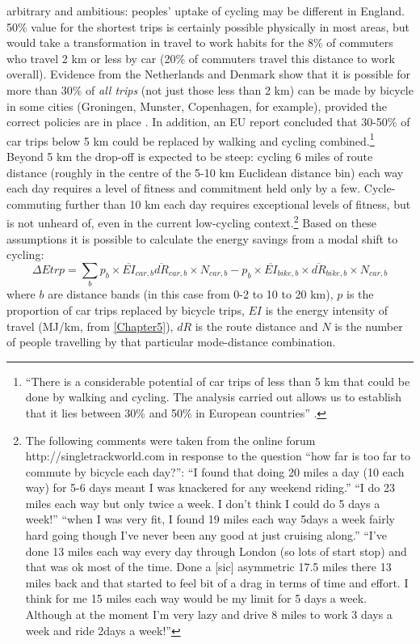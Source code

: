 \documentclass[a4paper, 11pt, twoside]{Thesis}
\begin{document}
arbitrary and ambitious: peoples' uptake of cycling may be different in England.
50\% value for the shortest trips is certainly possible physically in most
areas, but would
take a transformation in travel to work habits for the 8\% of commuters who
travel 2 km or less by car (20\% of commuters travel this distance to work
overall). Evidence from the Netherlands and Denmark show that it
is possible for more than 30\% of \emph{all trips} (not just those less than 2
km) can be made by bicycle in some cities (Groningen, Munster, Copenhagen,
for example), provided the correct policies are in place \citep{Rietveld2004,
Pucher2010}.
In addition, an EU report concluded that 30-50\% of car trips below
5 km could be replaced by walking and cycling
combined.\footnote{``There
is a considerable potential of car trips of less than 5 km that could be
done by walking and cycling. The analysis carried out allows us to establish
that it lies between 30\% and 50\% in European countries''
\citep[p.~60]{Gnavi1999walcying}.
}
Beyond 5 km the drop-off is expected to be steep: cycling 6 miles of route
distance (roughly in the centre of the 5-10 km Euclidean distance bin) each way
each day requires a level of fitness and commitment held only by a few.
Cycle-commuting further than 10 km each day requires exceptional levels of
fitness, but is not unheard of, even in the current low-cycling
context.\footnote{The following comments
were taken from the online forum http://singletrackworld.com in response to
the question ``how far is too far to commute by bicycle each day?'': ``I found
that doing 20 miles a day (10 each way) for 5-6 days meant I was knackered for
any weekend riding.'' ``I do 23 miles each way but only twice a week. I don't
think I could do 5 days a week!''  ``when I was very fit, I found 19 miles each
way 5days a week fairly hard going though I've never been any good at just
cruising along.'' ``I've done 13 miles each way every day through London (so
lots of start stop) and that was ok most of the time. Done a [sic] asymmetric 17.5
miles there 13 miles back and that started to feel bit of a drag in terms of
time and effort. I think for me 15 miles each way would be my limit for 5
days a week.
Although at the moment I'm very lazy and drive 8 miles to work 3 days a week and
ride 2days a week!''
}
Based on these assumptions it is possible to calculate the energy savings from
a modal shift to cycling:
\begin{equation}
 \Delta Etrp = \sum_{b} p_b \times \overline{EI}_{car,b}
\overline{dR}_{car,b} \times N_{car,b} - p_b \times \overline{EI}_{bike,b}
\times \overline{dR}_{bike,b} \times N_{car,b}
\end{equation}
where $b$ are distance bands (in this case from 0-2 to 10 to 20 km), $p$ is
the proportion of car trips replaced by bicycle trips, $EI$ is the energy
intensity of travel (MJ/km, from \cref{Chapter5}), $dR$ is the route distance
and $N$ is the number of people travelling by that particular mode-distance
combination. 
\end{document}
